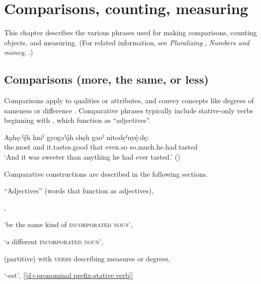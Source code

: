 \chapter{Comparisons, counting, measuring} \label{ch:Comparisons, counting, measuring}
This chapter describes the various phrases used for making comparisons, counting objects, and measuring. (For related information, see \textit{Pluralizing} , \textit{Numbers and money}, .)

\section{Comparisons (more, the same, or less)} \label{ch:Comparisons (more, the same, or less)}
Comparisons apply to qualities or attributes, and convey concepts like degrees of sameness or difference . Comparative phrases typically include stative-only verbs beginning with  \textsc{\partitive}, which function as “adjectives”. 

\ea\label{ex:comparisonclause}
\gll Aǫhę:ˀę́h hniˀ gyogaˀǫ́h shęh gaoˀ nitode̱ˀnyę́:dę: \\
the.most and it.tastes.good that even.so so.much.he.had.tasted \\
\glt ‘And it was sweeter than anything he had ever tasted.’ (\cite{carrier_legends_2013})
\z

Comparative constructions are described in the following sections.

\begin{CayugaRelated}
\item{}“Adjectives” (words that function as adjectives), 

\item{}, 

\item{} ‘be the same kind of \textsc{incorporated noun}’, 

\item{} ‘a different \textsc{incorporated noun}’, 

\item{} (partitive) with \textsc{verbs} describing measures or degrees, 

\item{} ‘-est’, \ref{[d+pronominal prefix-stative.verb]}

\end{CayugaRelated}

